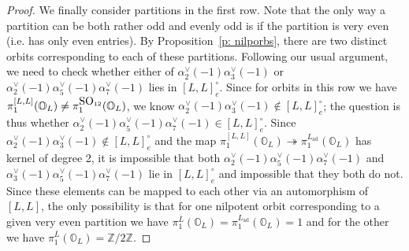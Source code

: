 \documentclass[11pt]{amsart}
\renewcommand{\O}{{\mathbb O}}
\newcommand{\bZ}{{\mathbb Z}}
\newcommand{\ad}{{\operatorname{ad}}}
\newcommand{\SO}{{{\mbox{\rm SO}}}}
\numberwithin{equation}{section}
\begin{document}
\begin{proof}
		We finally consider partitions in the first row. Note that the only way a partition can be both rather odd and evenly odd is if the partition is very even (i.e. has only even entries). By Proposition~\ref{p: nilporbs}, there are two distinct orbits corresponding to each of these partitions. Following our usual argument, we need to check whether either of $\alpha_2^\vee(-1)\alpha_3^\vee(-1)$ or $\alpha_2^\vee(-1)\alpha_5^\vee(-1)\alpha_7^\vee(-1)$ lies in $[L,L]_e^\circ$. Since for orbits in this row we have $\pi_1^{[L,L]}(\O_L)\neq\pi_1^{\tiny \SO_{12}}(\O_L)$, we know $\alpha_2^\vee(-1)\alpha_3^\vee(-1)\notin [L,L]_e^\circ$; the question is thus whether $\alpha_2^\vee(-1)\alpha_5^\vee(-1)\alpha_7^\vee(-1) \in [L,L]_e^\circ$. Since $\alpha_2^\vee(-1)\alpha_3^\vee(-1)\notin [L,L]_e^\circ$ and the map $\pi_1^{[L,L]}(\O_L)\twoheadrightarrow \pi_1^{L_\ad}(\O_L)$ has kernel of degree 2, it is impossible that both $\alpha_2^\vee(-1)\alpha_5^\vee(-1)\alpha_7^\vee(-1)$ and $\alpha_3^\vee(-1)\alpha_5^\vee(-1)\alpha_7^\vee(-1)$ lie in $[L,L]_e^\circ$ and impossible that they both do not. Since these elements can be mapped to each other via an automorphism of $[L,L]$, the only possibility is that for one nilpotent orbit corresponding to a given very even partition we have $\pi_1^{\overline{L}}(\O_L)= \pi_1^{L_\ad}(\O_L)=1$ and for the other we have $\pi_1^{\overline{L}}(\O_L)=\bZ/2\bZ$.
		

\end{proof}
\end{document}
